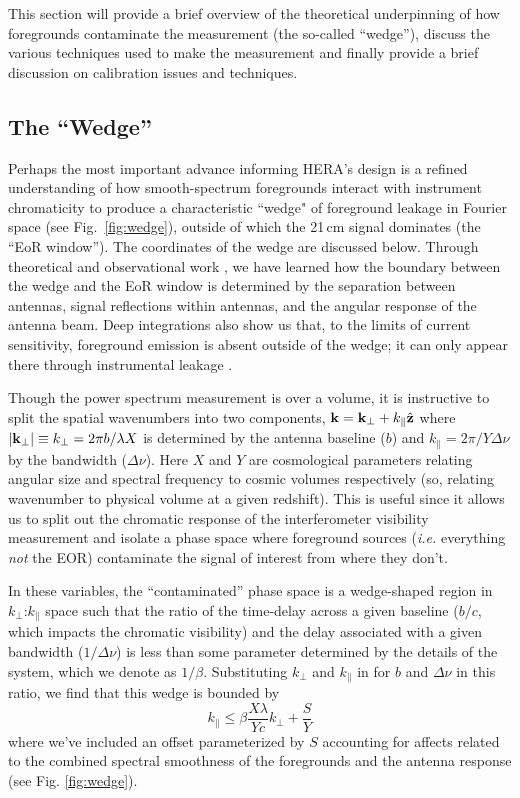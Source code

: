 \documentclass[preprint,11pt]{aastex}
\newcommand{\kvec}{{\bf k}}
\newcommand{\kpr}{{k_\perp}}
\newcommand{\kvpr}{{\kvec_\perp}}
\def\kpar{k_{\|}}
\begin{document}
This section will provide a brief overview of  the theoretical underpinning of how foregrounds contaminate the measurement (the so-called ``wedge''), discuss the various techniques used to make the measurement and finally provide a brief discussion on calibration issues and techniques.

\subsection{The ``Wedge''}
\label{sec:wedge}
Perhaps the most important advance informing HERA's design is a
refined understanding of how smooth-spectrum foregrounds interact
with instrument chromaticity to produce a characteristic ``wedge" of
foreground leakage in Fourier space (see Fig.~\ref{fig:wedge}), 
outside of which the 21\,cm signal dominates (the ``EoR window'').  The coordinates of the wedge are discussed below.
Through theoretical and observational work
\citep{datta_etal2010,morales_et_al2012,parsons_et_al2012b,vedantham_2012,thyagarajan_et_al2013,hazelton_et_al2013,pober_etal2013b,liu_et_al2014a,liu_et_al2014b},
we have learned how the boundary between the wedge and  the EoR window is determined by the separation between antennas,
signal reflections within antennas, and the angular response of the antenna beam.  Deep integrations also show us
that, to the limits of current sensitivity, foreground emission is absent outside of the wedge; it can only 
appear there through instrumental leakage \citep{parsons_etal2014,ali_et_al2015,moore_et_al2016,kohn_et_al2016}.

Though the power spectrum measurement is over a volume, it is instructive to split the spatial wavenumbers into two components,  $\kvec =  \kvpr + \kpar{\hat {\bf z}}$ where $|\kvpr|\equiv \kpr = 2\pi b/\lambda X$ is determined by the antenna baseline ($b$) and $\kpar=2\pi/Y\Delta\nu$ by the bandwidth ($\Delta\nu$).  Here $X$ and $Y$ are cosmological parameters relating angular size and spectral frequency to cosmic volumes respectively (so, relating wavenumber to physical volume at a given redshift).  This is useful since it allows us to split out the chromatic response of the interferometer visibility measurement and isolate a phase space where foreground sources ({\em i.e.} everything {\em not} the EOR) contaminate the signal of interest from where they don't.  

In these variables, the ``contaminated'' phase space is a wedge-shaped region in $\kpr$:$\kpar$ space such that the ratio of the time-delay across a given baseline ($b/c$,  which impacts the chromatic visibility) and the delay associated with a given bandwidth ($1/\Delta\nu$) is less than some parameter determined by the details of the system, which we denote as $1/\beta$.  Substituting $\kpr$ and $\kpar$ in for $b$ and $\Delta\nu$ in this ratio, we find that this wedge is bounded by
\begin{equation}
\kpar \le \beta\frac{X\lambda}{Yc}\kpr + \frac{S}{Y}
\end{equation}
where we've included an offset parameterized by $S$ accounting for affects related to the combined spectral smoothness of the foregrounds and the antenna response (see Fig. \ref{fig:wedge}). 
\end{document}
